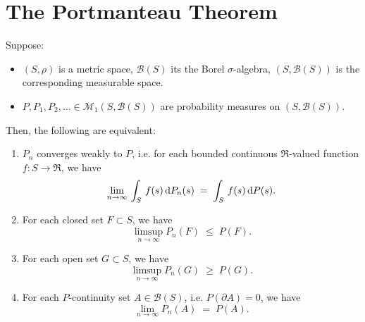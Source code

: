

\section{The Portmanteau Theorem}
\setcounter{theorem}{0}
\setcounter{equation}{0}

\renewcommand{\theenumi}{\roman{enumi}}
\renewcommand{\labelenumi}{\textnormal{(\theenumi)}$\;\;$}

\begin{theorem}
\mbox{}\vskip 0.2cm
\noindent
Suppose:
\begin{itemize}
\item	$\left(S,\rho\right)$ is a metric space, $\mathcal{B}(S)$ its the Borel $\sigma$-algebra,
		$\left(S,\mathcal{B}(S)\right)$ is the corresponding measurable space.
\item	$P, P_{1}, P_{2}, \ldots \in \mathcal{M}_{1}\!\left(S,\mathcal{B}(S)\right)$
		are probability measures on $\left(S,\mathcal{B}(S)\right)$.
\end{itemize}
Then, the following are equivalent:
\begin{enumerate}
\item	$P_{n}$ converges weakly to $P$,
		i.e. for each bounded continuous $\Re$-valued function $f : S \longrightarrow \Re$, we have
		\begin{equation*}
		\lim_{n\rightarrow\infty}\,\int_{S}\,f(s)\,\textnormal{d} P_{n}(s) \;=\; \int_{S}\,f(s)\,\textnormal{d} P(s).
		\end{equation*}
\item	For each closed set $F \subset S$, we have
		\begin{equation*}
		\limsup_{n\rightarrow\infty}P_{n}(F) \;\leq\; P(F).
		\end{equation*}
\item	For each open set $G \subset S$, we have
		\begin{equation*}
		\limsup_{n\rightarrow\infty}P_{n}(G) \;\geq\; P(G).
		\end{equation*}
\item	For each $P$-continuity set $A \in \mathcal{B}(S)$, i.e. $P(\partial A) = 0$, we have
		\begin{equation*}
		\lim_{n\rightarrow\infty}P_{n}(A) \;=\; P(A).
		\end{equation*}
\end{enumerate}
\end{theorem}

